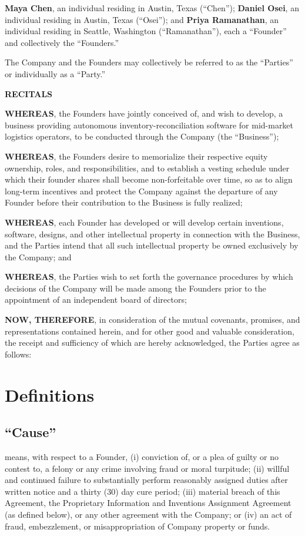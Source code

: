 \textbf{Maya Chen}, an individual residing in Austin, Texas (``Chen''); \textbf{Daniel Osei}, an individual residing in Austin, Texas (``Osei''); and \textbf{Priya Ramanathan}, an individual residing in Seattle, Washington (``Ramanathan''), each a ``Founder'' and collectively the ``Founders.''

The Company and the Founders may collectively be referred to as the ``Parties'' or individually as a ``Party.''

\vspace{1.0em}
\centerline{\textbf{RECITALS}}
\vspace{0.5em}

\textbf{WHEREAS}, the Founders have jointly conceived of, and wish to develop, a business providing autonomous inventory-reconciliation software for mid-market logistics operators, to be conducted through the Company (the ``Business'');

\textbf{WHEREAS}, the Founders desire to memorialize their respective equity ownership, roles, and responsibilities, and to establish a vesting schedule under which their founder shares shall become non-forfeitable over time, so as to align long-term incentives and protect the Company against the departure of any Founder before their contribution to the Business is fully realized;

\textbf{WHEREAS}, each Founder has developed or will develop certain inventions, software, designs, and other intellectual property in connection with the Business, and the Parties intend that all such intellectual property be owned exclusively by the Company; and

\textbf{WHEREAS}, the Parties wish to set forth the governance procedures by which decisions of the Company will be made among the Founders prior to the appointment of an independent board of directors;

\textbf{NOW, THEREFORE}, in consideration of the mutual covenants, promises, and representations contained herein, and for other good and valuable consideration, the receipt and sufficiency of which are hereby acknowledged, the Parties agree as follows:

\section{Definitions}

\subsection{``Cause''} means, with respect to a Founder, (i) conviction of, or a plea of guilty or no contest to, a felony or any crime involving fraud or moral turpitude; (ii) willful and continued failure to substantially perform reasonably assigned duties after written notice and a thirty (30) day cure period; (iii) material breach of this Agreement, the Proprietary Information and Inventions Assignment Agreement (as defined below), or any other agreement with the Company; or (iv) an act of fraud, embezzlement, or misappropriation of Company property or funds.


